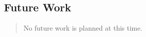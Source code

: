 \documentclass[10pt]{article}%
\begin{document}
\subsection*{Future Work}

\begin{quotation} No future work is planned at this time.\end{quotation}
    

%
\end{document}
